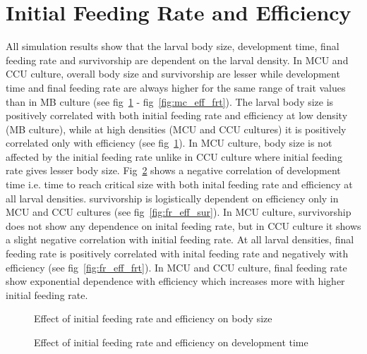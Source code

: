 \section{Initial Feeding Rate and Efficiency}
All simulation results show that the larval body size, development time, final feeding rate and survivorship are dependent on the larval density. In MCU and CCU culture, overall body size and survivorship are lesser while development time and final feeding rate are always higher for the same range of trait values than in MB culture (see fig~\ref{fig:fr_eff_bs} - fig~\ref{fig:mc_eff_frt}). The larval body size is positively correlated with both initial feeding rate and efficiency at low density (MB culture), while at high densities (MCU and CCU cultures) it is positively correlated only with efficiency (see fig~\ref{fig:fr_eff_bs}). In MCU culture, body size is not affected by the initial feeding rate unlike in CCU culture where initial feeding rate gives lesser body size. Fig~\ref{fig:fr_eff_dt} shows a negative correlation of development time i.e. time to reach critical size with both inital feeding rate and efficiency at all larval densities. survivorship is logistically dependent on efficiency only in MCU and CCU cultures (see fig~\ref{fig:fr_eff_sur}). In MCU culture, survivorship does not show any dependence on inital feeding rate, but in CCU culture it shows a slight negative correlation with initial feeding rate. At all larval densities, final feeding rate is positively correlated with inital feeding rate and negatively with efficiency (see fig~\ref{fig:fr_eff_frt}). In MCU and CCU culture, final feeding rate show exponential dependence with efficiency which increases more with higher initial feeding rate.
\begin{figure}[h]
\caption{Effect of initial feeding rate and efficiency on body size}
\label{fig:fr_eff_bs}
\end{figure}
\begin{figure}[p]
\caption{Effect of initial feeding rate and efficiency on development time}
\label{fig:fr_eff_dt}
\end{figure}

